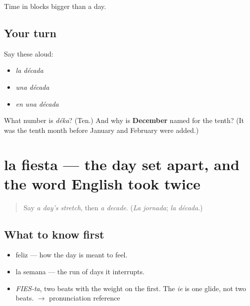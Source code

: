 \begin{grammarlens}[title={What you've built}]
Time in blocks bigger than a day.
\end{grammarlens}

\subsection*{Your turn}
Say these aloud:

\begin{itemize}
\raggedright
  \item \emph{la década}
  \item \emph{una década}
  \item \emph{en una década}
\end{itemize}

\begin{tcolorbox}[breakable,colback=teal!4,colframe=teal!35!black,title={Before you move on}]
What number is \emph{déka}? (Ten.) And why is \textbf{December} named for the tenth? (It was the tenth month before January and February were added.)
\end{tcolorbox}
\section[la fiesta]{la fiesta — the day set apart, and the word English took twice}

\label{lesson:ES-C349-fiesta}



\begin{quote}
Say \emph{a day's stretch}, then \emph{a decade}. (\emph{La jornada}; \emph{la década}.)
\end{quote}

\subsection*{What to know first}
\begin{itemize}
\raggedright
  \item feliz — how the day is meant to feel.
  \item la semana — the run of days it interrupts.
\end{itemize}

\begin{sounds}
\begin{itemize}
\raggedright
  \item \emph{FIES-ta}, two beats with the weight on the first. The \emph{ie} is one glide, not two beats. $\to$ pronunciation reference
\end{itemize}
\end{sounds}

